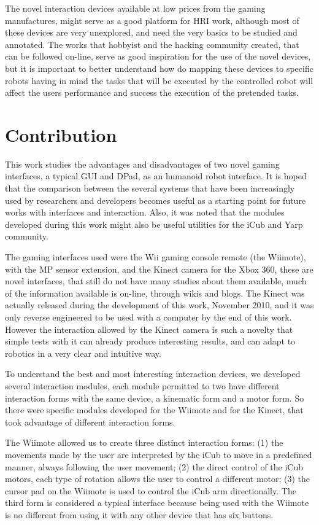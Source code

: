  The novel interaction devices available at low prices from the gaming manufactures, might serve as a good platform for \ac{HRI} work, although most of these devices are very unexplored, and need the very basics to be studied and annotated. The works that hobbyist and the hacking community created, that can be followed on-line, serve as good inspiration for the use of the novel devices, but it is important to better understand how do mapping these devices to specific robots having in mind the tasks that will be executed by the controlled robot will affect the users performance and success the execution of the pretended tasks.

\section{Contribution}

	This work studies the advantages and disadvantages of two novel gaming interfaces, a typical \acf{GUI} and \acf{DPad}, as an humanoid robot interface. It is hoped that the comparison between the several systems that have been increasingly used by researchers and developers becomes useful as a starting point for future works with interfaces and interaction. Also, it was noted that the modules developed during this work might also be useful utilities for the iCub and Yarp community. 
	
	The gaming interfaces used were the Wii gaming console remote (the \acf{Wiimote}), with the \acf{MP} sensor extension, and the Kinect camera for the Xbox 360, these are novel interfaces, that still do not have many studies about them available, much of the information available is on-line, through wikis and blogs. The Kinect was actually released during the development of this work, November 2010, and it was only reverse engineered to be used with a computer by the end of this work. However the interaction allowed by the Kinect camera is such a novelty that simple tests with it can already produce interesting results, and can adapt to robotics in a very clear and intuitive way.
	
	To understand the best and most interesting interaction devices, we developed several interaction modules, each module permitted to two have different interaction forms with the same device, a kinematic form and a motor form. So there were specific modules developed for the \ac{Wiimote} and for the Kinect, that took advantage of different interaction forms.
 
 The \ac{Wiimote} allowed us to create three distinct interaction forms: (1) the movements made by the user are interpreted by the iCub to move in a predefined manner, always following the user movement; (2) the direct control of the iCub motors, each type of rotation allows the user to control a different motor; (3) the cursor pad on the \ac{Wiimote} is used to control the iCub arm directionally. The third form is considered a typical interface because being used with the \ac{Wiimote} is no different from using it with any other device that has six buttons.
 
